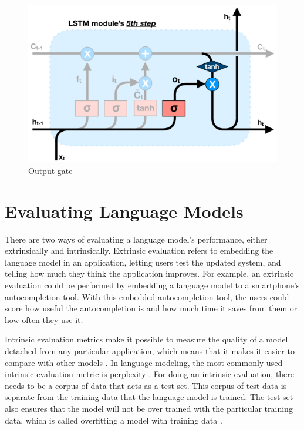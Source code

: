 \begin{figure}[!htbp]
    \centering
    \includegraphics[width=12cm,height=\textheight,keepaspectratio]{lstm_5}
    \caption{Output gate}
    \label{fig:lstm_5}
\end{figure}


\section{Evaluating Language Models}
There are two ways of evaluating a language model's performance, either extrinsically and intrinsically. Extrinsic evaluation refers to embedding the language model in an application, letting users test the updated system, and telling how much they think the application improves. For example, an extrinsic evaluation could be performed by embedding a language model to a smartphone's autocompletion tool. With this embedded autocompletion tool, the users could score how useful the autocompletion is and how much time it saves from them or how often they use it. 

Intrinsic evaluation metrics make it possible to measure the quality of a model detached from any particular application, which means that it makes it easier to compare with other models \parencite{jurafsky2014speech}. In language modeling, the most commonly used intrinsic evaluation metric is perplexity \parencite{goodman2001bit,mikolov2012statistical}. For doing an intrinsic evaluation, there needs to be a corpus of data that acts as a test set. This corpus of test data is separate from the training data that the language model is trained. The test set also ensures that the model will not be over trained with the particular training data, which is called overfitting a model with training data \parencite{jurafsky2014speech}.

